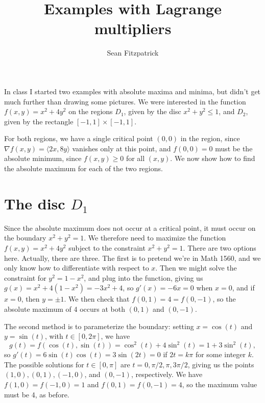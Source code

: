 \documentclass[12pt,letterpaper]{article}
\title{Examples with Lagrange multipliers}
\author{Sean Fitzpatrick}
\begin{document}
\maketitle

In class I started two examples with absolute maxima and minima, but didn't get much further than drawing some pictures. We were interested in the function $f(x,y)=x^2+4y^2$ on the regions $D_1$, given by the disc $x^2+y^2\leq 1$, and $D_2$, given by the rectangle $[-1,1]\times [-1,1]$.

For both regions, we have a single critical point $(0,0)$ in the region, since $\nabla f(x,y) = \langle 2x, 8y\rangle$ vanishes only at this point, and $f(0,0)=0$ must be the absolute minimum, since $f(x,y)\geq 0$ for all $(x,y)$. We now show how to find the absolute maximum for each of the two regions.

\section{The disc $D_1$}
Since the absolute maximum does not occur at a critical point, it must occur on the boundary $x^2+y^2=1$. We therefore need to maximize the function $f(x,y)=x^2+4y^2$ subject to the constraint $x^2+y^2=1$. There are two options here. Actually, there are three. The first is to pretend we're in Math 1560, and we only know how to differentiate with respect to $x$. Then we might solve the constraint for $y^2=1-x^2$, and plug into the function, giving us $g(x)=x^2+4(1-x^2) = -3x^2+4$, so $g'(x)=-6x=0$ when $x=0$, and if $x=0$, then $y=\pm 1$. We then check that $f(0,1)=4=f(0,-1)$, so the absolute maximum of 4 occurs at both $(0,1)$ and $(0,-1)$.

\bigskip

The second method is to parameterize the boundary: setting $x=\cos(t)$ and $y=\sin(t)$, with $t\in [0,2\pi]$, we have
\[
 g(t) = f(\cos(t),\sin(t)) = \cos^2(t)+4\sin^2(t) = 1+3\sin^2(t),
\]
so $g'(t) = 6\sin(t)\cos(t) = 3\sin(2t) = 0$ if $2t = k\pi$ for some integer $k$. The possible solutions for $t\in [0,\pi]$ are $t=0,\pi/2, \pi, 3\pi/2$, giving us the points $(1,0), (0,1), (-1,0)$, and $(0,-1)$, respectively. We have $f(1,0) = f(-1,0)=1$ and $f(0,1)=f(0,-1)=4$, so the maximum value must be 4, as before.

\bigskip
\end{document}
